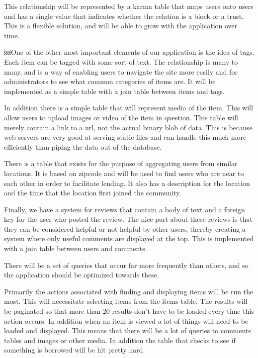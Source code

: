 \documentclass{acm_proc_article-sp}
\begin{document}
This relationship will be represented by a karma table that maps users onto users and has a single value that indicates whether the relation is a block or a trust. This is a flexible solution, and will be able to grow with the application over time.

￼One of the other most important elements of our application is the idea of tags. Each item can be tagged with some sort of text. The relationship is many to many, and is a way of enabling users to navigate the site more easily and for administrators to see what common categories of items are. It will be implemented as a simple table with a join table between items and tags.

In addition there is a simple table that will represent media of the item. This will allow users to upload images or video of the item in question. This table will merely contain a link to a url, not the actual binary blob of data. This is because web servers are very good at serving static files and can handle this much more efficiently than piping the data out of the database.

There is a table that exists for the purpose of aggregating users from similar locations. It is based on zipcode and will be used to find users who are near to each other in order to facilitate lending. It also has a description for the location and the time that the location first joined the community.

Finally, we have a system for reviews that contain a body of text and a foreign key for the user who posted the review. The nice part about these reviews is that they can be considered helpful or not helpful by other users, thereby creating a system where only useful comments are displayed at the top. This is implemented with a join table between users and comments.

There will be a set of queries that occur far more frequently than others, and so the application should be optimized towards these.

Primarily the actions associated with finding and displaying items will be run the most. This will necessitate selecting items from the items table. The results will be paginated so that more than 20 results don't have to be loaded every time this action occurs. In addition when an item is viewed a lot of things will need to be loaded and displayed. This means that there will be a lot of queries to comments tables and images or other media. In addition the table that checks to see if something is borrowed will be hit pretty hard.
\end{document}

